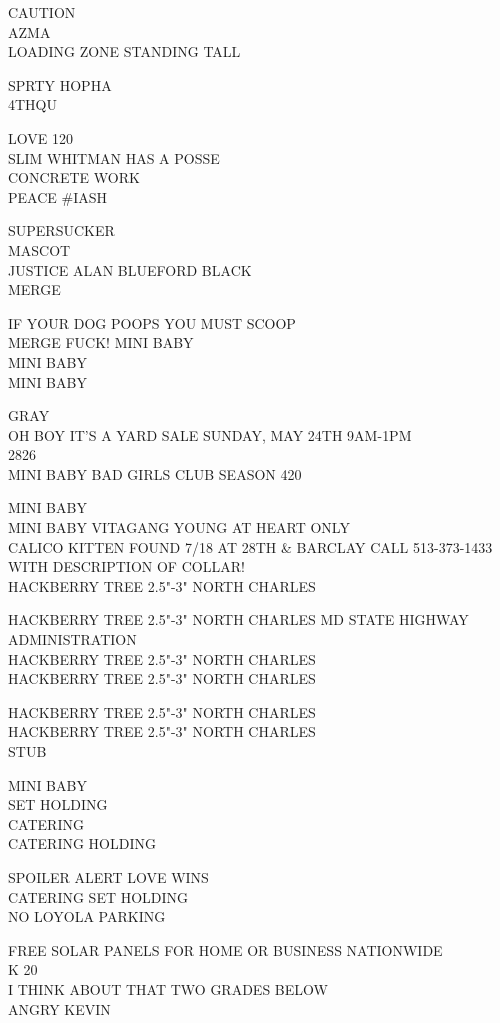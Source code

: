 \documentclass[10pt,letterpaper]{article}
\begin{document}
CAUTION\\
AZMA\\
LOADING ZONE STANDING TALL

SPRTY HOPHA\\
4THQU

LOVE 120\\
SLIM WHITMAN HAS A POSSE\\
CONCRETE WORK\\
PEACE \#IASH

SUPERSUCKER\\
MASCOT\\
JUSTICE ALAN BLUEFORD BLACK\\
MERGE

IF YOUR DOG POOPS YOU MUST SCOOP\\
MERGE FUCK! MINI BABY\\
MINI BABY\\
MINI BABY

GRAY\\
OH BOY IT'S A YARD SALE SUNDAY, MAY 24TH 9AM{-}1PM\\
2826\\
MINI BABY BAD GIRLS CLUB SEASON 420

MINI BABY\\
MINI BABY VITAGANG YOUNG AT HEART ONLY\\
CALICO KITTEN FOUND 7/18 AT 28TH \& BARCLAY CALL 513{-}373{-}1433 WITH DESCRIPTION OF COLLAR!\\
HACKBERRY TREE 2.5"{-}3" NORTH CHARLES

HACKBERRY TREE 2.5"{-}3" NORTH CHARLES MD STATE HIGHWAY ADMINISTRATION\\
HACKBERRY TREE 2.5"{-}3" NORTH CHARLES\\
HACKBERRY TREE 2.5"{-}3" NORTH CHARLES

HACKBERRY TREE 2.5"{-}3" NORTH CHARLES\\
HACKBERRY TREE 2.5"{-}3" NORTH CHARLES\\
STUB

MINI BABY\\
SET HOLDING\\
CATERING\\
CATERING HOLDING

SPOILER ALERT LOVE WINS\\
CATERING SET HOLDING\\
NO LOYOLA PARKING

FREE SOLAR PANELS FOR HOME OR BUSINESS NATIONWIDE\\
K 20\\
I THINK ABOUT THAT TWO GRADES BELOW\\
ANGRY KEVIN
\end{document}
